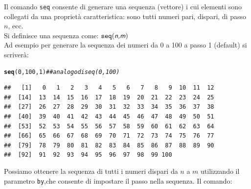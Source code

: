 \documentclass[onecolumn,11pt]{book}\usepackage[]{graphicx}\usepackage[]{color}
\makeatletter
\newcommand{\hlnum}[1]{\textcolor[rgb]{0.686,0.059,0.569}{#1}}%
\newcommand{\hlcom}[1]{\textcolor[rgb]{0.678,0.584,0.686}{\textit{#1}}}%
\newcommand{\hlstd}[1]{\textcolor[rgb]{0.345,0.345,0.345}{#1}}%
\newcommand{\hlkwd}[1]{\textcolor[rgb]{0.737,0.353,0.396}{\textbf{#1}}}%
\newenvironment{kframe}{%
 \def\at@end@of@kframe{}%
 \ifinner\ifhmode%
  \def\at@end@of@kframe{\end{minipage}}%
  \begin{minipage}{\columnwidth}%
 \fi\fi%
 \def\FrameCommand##1{\hskip\@totalleftmargin \hskip-\fboxsep
 \colorbox{shadecolor}{##1}\hskip-\fboxsep
     \hskip-\linewidth \hskip-\@totalleftmargin \hskip\columnwidth}%
 \MakeFramed {\advance\hsize-\width
   \@totalleftmargin\z@ \linewidth\hsize
   \@setminipage}}%
 {\par\unskip\endMakeFramed%
 \at@end@of@kframe}
\newenvironment{knitrout}{}{} %
\newcommand{\varia}[1]{\textsl{\textsf{#1}}}
\makeatother
\begin{document}
Il comando \texttt{seq} consente di generare una sequenza (vettore) i cui elementi sono collegati da una propriet\`a caratteristica: sono tutti numeri pari, dispari, di passo $n$, ecc.\\
Si definisce una sequenza come: $\texttt{seq}(\varia{n,m})$\\ %
Ad esempio per generare la sequenza dei numeri da 0 a 100 a passo 1 (default) si scriver\`a:

\begin{knitrout}
\color{fgcolor}\begin{kframe}
\begin{alltt}
\hlkwd{seq}\hlstd{(}\hlnum{0}\hlstd{,}\hlnum{100}\hlstd{,}\hlnum{1}\hlstd{)} \hlcom{##analogo di seq(0,100)}
\end{alltt}
\begin{verbatim}
##   [1]   0   1   2   3   4   5   6   7   8   9  10  11  12
##  [14]  13  14  15  16  17  18  19  20  21  22  23  24  25
##  [27]  26  27  28  29  30  31  32  33  34  35  36  37  38
##  [40]  39  40  41  42  43  44  45  46  47  48  49  50  51
##  [53]  52  53  54  55  56  57  58  59  60  61  62  63  64
##  [66]  65  66  67  68  69  70  71  72  73  74  75  76  77
##  [79]  78  79  80  81  82  83  84  85  86  87  88  89  90
##  [92]  91  92  93  94  95  96  97  98  99 100
\end{verbatim}
\end{kframe}
\end{knitrout}
Possiamo ottenere la sequenza di tutti i numeri dispari da $n$ a $m$ utilizzando il parametro \texttt{by},che consente di impostare il passo nella sequenza.
Il comando:
\end{document}
